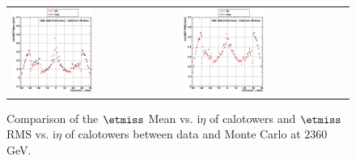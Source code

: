 \begin{figure}[h!]
 \centering
 \begin{tabular}{ll}
  \includegraphics[width=0.5\textwidth]{plots_DataVsMC_MB_2360GeV/g_calometPtMean_vs_ieta_2360.eps} &
  \includegraphics[width=0.5\textwidth]{plots_DataVsMC_MB_2360GeV/g_calometPtRMS_vs_ieta_2360.eps} \\
 \end{tabular}
 \caption{\small Comparison of the $\etmiss$ Mean vs. i$\eta$ of calotowers and $\etmiss$ RMS vs. i$\eta$ of calotowers between 
          data and Monte Carlo at $2360$ GeV.\label{fig:MET_MeanRMS_vs_ieta_2360}}
\end{figure}

